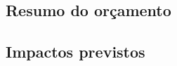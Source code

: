 
\subsection{Resumo do orçamento}
\label{ssec:orca}

\subsection{Impactos previstos}
\label{ssec:impact}

